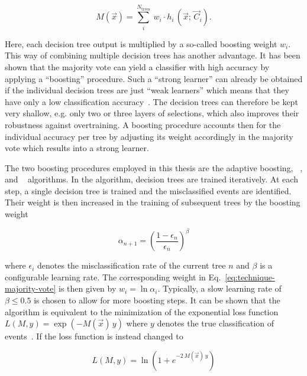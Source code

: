 \begin{equation}
M(\vec{x})=\sum_{i}^{N_\mathrm{trees}}~w_{i}\cdot h_{i}\,(\vec{x};\,\vec{C}_{i}).\label{eq:technique-majority-vote}
\end{equation}

Here, each decision tree output is multiplied by a so-called boosting weight $w_{i}$. This way of combining multiple decision trees has another advantage. It has been shown that the majority vote can yield a classifier with high accuracy by applying a ``boosting'' procedure. Such a ``strong learner'' can already be obtained if the individual decision trees are just ``weak learners'' which means that they have only a low classification accuracy~\cite{Schapire1990,FREUND1995256}. The decision trees can therefore be kept very shallow, e.g. only two or three layers of selections, which also improves their robustness against overtraining. A boosting procedure accounts then for the individual accuracy per tree by adjusting its weight accordingly in the majority vote which results into a strong learner.

The two boosting procedures employed in this thesis are the adaptive boosting, \ADABOOST[]~\cite{FREUND1997119}, and \GRADIENTBOOST[]~\cite{Friedman00greedyfunction} algorithms. In the \ADABOOST algorithm, decision trees are trained iteratively. At each step, a single decision tree is trained and the misclassified events are identified. Their weight is then increased in the training of subsequent trees by the boosting weight

\begin{equation}
\alpha_{n+1}=\left(\frac{1-\epsilon_{n}}{\epsilon_{n}}\right)^\beta
\end{equation}

where $\epsilon_{i}$ denotes the misclassification rate of the current tree $n$ and $\beta$ is a configurable learning rate. The corresponding weight in Eq.~\ref{eq:technique-majority-vote} is then given by $w_{i}=\ln\alpha_{i}$. Typically, a slow learning rate of $\beta\leq0.5$ is chosen to allow for more boosting steps. It can be shown that the \ADABOOST algorithm is equivalent to the minimization of the exponential loss function $L(M,y)=\exp(-M(\vec{x})\,y)$ where $y$ denotes the true classification of events~\cite{Hocker:2007ht}. If the loss function is instead changed to 

\begin{equation}
L(M,y)=\ln\left(1+e^{-2\,M(\vec{x})\,y}\right)
\end{equation}

